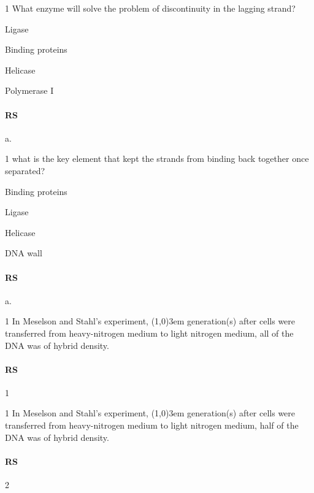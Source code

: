\documentclass[\mainfilename]{subfiles}
\begin{document}
\begin{questionBox}1{ %
    What enzyme will solve the problem of discontinuity in the lagging strand?
} %
    \begin{enumerate}
        \begin{multicols}{2}
            \item Ligase
            \item Binding proteins 
            \item Helicase
            \item Polymerase I
        \end{multicols}
    \end{enumerate}
    \paragraph*{RS} a.
\end{questionBox}

\begin{questionBox}1{ %
    what is the key element that kept the strands from binding back together once separated?
} %
    \begin{enumerate}
        \begin{multicols}{2}
            \item Binding proteins
            \item Ligase
            \item Helicase 
            \item DNA wall
        \end{multicols}
    \end{enumerate}
    \paragraph*{RS} a.
\end{questionBox}

\begin{questionBox}1{ %
    In Meselson and Stahl's experiment, \line(1,0){3em} generation(s) after cells were transferred from heavy-nitrogen medium to light nitrogen medium, all of the DNA was of hybrid density.
} %
    \paragraph*{RS} 1
\end{questionBox}

\begin{questionBox}1{ %
    In Meselson and Stahl's experiment, \line(1,0){3em} generation(s) after cells were transferred from heavy-nitrogen medium to light nitrogen medium, half of the DNA was of hybrid density.
} %
    \paragraph*{RS} 2
\end{questionBox}
\end{document}
